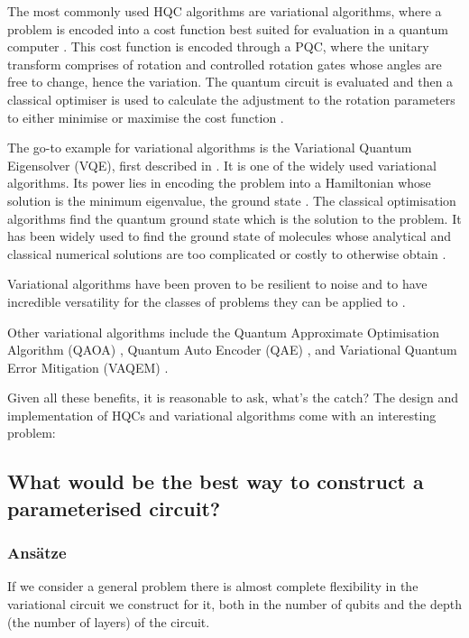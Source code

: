 The most commonly used HQC algorithms are variational algorithms, where a problem is encoded into a cost function best suited for evaluation in a quantum computer \cite{wecker_progress_2015}. This cost function is encoded through a PQC, where the unitary transform comprises of rotation and controlled rotation gates whose angles are free to change, hence the variation. The quantum circuit is evaluated and then a classical optimiser is used to calculate the adjustment to the rotation parameters to either minimise or maximise the cost function \cite{cerezo_variational_2021}. 

The go-to example for variational algorithms is the Variational Quantum Eigensolver (VQE), first described in 
\cite{peruzzo_variational_2014}. It is one of the widely used variational algorithms. Its power lies in encoding the problem into a Hamiltonian whose solution is the minimum eigenvalue, the ground state \cite{tilly_variational_2022}. The classical optimisation algorithms find the quantum ground state which is the solution to the problem. It has been widely used to find the ground state of molecules whose analytical and classical numerical solutions are too complicated or costly to otherwise obtain \cite{kandala_hardware-efficient_2017}.

Variational algorithms have been proven to be resilient to noise \cite{sharma_noise_2020,ding_evaluating_2022,fontana_evaluating_2021} and to have incredible versatility for the classes of problems they can be applied to \cite{cerezo_variational_2021}.

Other variational algorithms include the Quantum Approximate Optimisation Algorithm (QAOA) \cite{farhi_quantum_2014}, Quantum Auto Encoder (QAE) \cite{romero_quantum_2017}, and Variational Quantum Error Mitigation (VAQEM) \cite{ravi_vaqem_2022}.

Given all these benefits, it is reasonable to ask, what's the catch? The design and implementation of HQCs and variational algorithms come with an interesting problem:

\subsection{What would be the best way to construct a parameterised circuit?}\label{subsec:ansatz}
\subsubsection{Ans{\"a}tze}

If we consider a general problem there is almost complete flexibility in the variational circuit we construct for it, both in the number of qubits and the depth (the number of layers) of the circuit.

